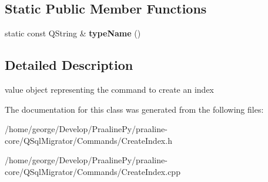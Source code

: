 \subsection*{Static Public Member Functions}
\begin{DoxyCompactItemize}
\item 
\mbox{\label{class_q_sql_migrator_1_1_commands_1_1_create_index_a4563578789a966d217e4aeac1de517a1}} 
static const Q\+String \& {\bfseries type\+Name} ()
\end{DoxyCompactItemize}


\subsection{Detailed Description}
value object representing the command to create an index 

The documentation for this class was generated from the following files\+:\begin{DoxyCompactItemize}
\item 
/home/george/\+Develop/\+Praaline\+Py/praaline-\/core/\+Q\+Sql\+Migrator/\+Commands/Create\+Index.\+h\item 
/home/george/\+Develop/\+Praaline\+Py/praaline-\/core/\+Q\+Sql\+Migrator/\+Commands/Create\+Index.\+cpp\end{DoxyCompactItemize}
